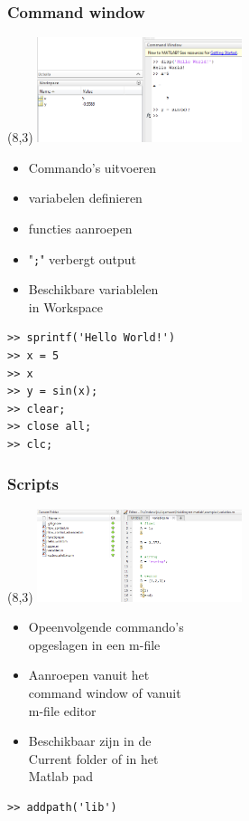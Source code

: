 \documentclass[t]{beamer}
\begin{document}
\begin{frame}[fragile]
	\frametitle{Command window}
    \begin{textblock}{6}(8,3)
        \includegraphics[width=6cm]{fig/commandwindow}
    \end{textblock}
    	
    \begin{itemize}
		\item Commando's uitvoeren
		\item variabelen definieren
		\item functies aanroepen
		\item "\lstinline{;}" verbergt output
		\item Beschikbare variablelen\\ in Workspace
	\end{itemize}
	
    \vspace{0.5cm}
    
	\begin{lstlisting}
>> sprintf('Hello World!')
>> x = 5
>> x
>> y = sin(x);
>> clear;
>> close all;
>> clc;
	\end{lstlisting}
\end{frame}
\begin{frame}[fragile]
	\frametitle{Scripts}
	\begin{textblock}{6}(8,3)
        \includegraphics[width=6cm]{fig/available}
    \end{textblock}
    
	\begin{itemize}
		\item Opeenvolgende commando's\\ opgeslagen in een m-file
		\item Aanroepen vanuit het \\command window of vanuit \\m-file editor
		\item Beschikbaar zijn in de \\Current folder of in het \\Matlab pad
	\end{itemize}
	
	\vspace{1cm}
	
	\begin{lstlisting}
>> addpath('lib')
	\end{lstlisting}
\end{frame}
\end{document}

